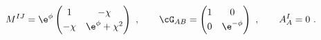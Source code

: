 \begin{equation}
  M^{IJ} = \e^{\phi} \begin{pmatrix} 1 & -\chi \\[2pt] -\chi & \e^\phi
  + \chi^2 \end{pmatrix}\ ,\qquad \cG_{AB} = \begin{pmatrix} 1 & 0
  \\[2pt] 0 & \e^{-\phi} \end{pmatrix}\ ,\qquad  A_A^I = 0\ .
 \end{equation}

